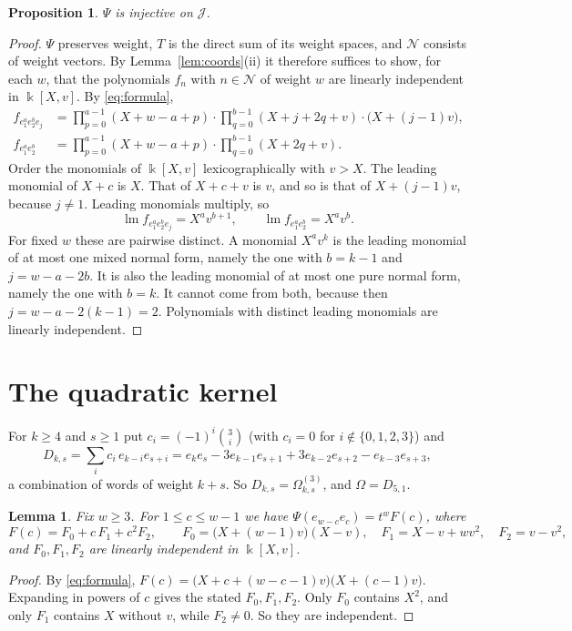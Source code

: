 \documentclass[11pt]{amsart}
\newtheorem{proposition}[theorem]{Proposition}
\newtheorem{lemma}[theorem]{Lemma}
\theoremstyle{definition}
\theoremstyle{remark}
\newcommand{\cJ}{\mathcal{J}}
\newcommand{\cN}{\mathcal{N}}
\newcommand{\lm}{\operatorname{lm}}
\newcommand{\kk}{\Bbbk}
\begin{document}
\begin{proposition}\label{prop:a}
$\Psi$ is injective on $\cJ$.
\end{proposition}

\begin{proof}
$\Psi$ preserves weight, $T$ is the direct sum of its weight spaces, and $\cN$ consists of weight vectors. By Lemma~\ref{lem:coords}(ii) it therefore suffices to show, for each $w$, that the polynomials $f_n$ with $n\in\cN$ of weight $w$ are linearly independent in $\kk[X,v]$. By \eqref{eq:formula},
\begin{align*}
f_{e_1^ae_2^be_j}&=\prod_{p=0}^{a-1}(X+w-a+p)\cdot\prod_{q=0}^{b-1}(X+j+2q+v)\cdot\bigl(X+(j-1)v\bigr),\\
f_{e_1^ae_2^b}&=\prod_{p=0}^{a-1}(X+w-a+p)\cdot\prod_{q=0}^{b-1}(X+2q+v).
\end{align*}
Order the monomials of $\kk[X,v]$ lexicographically with $v>X$. The leading monomial of $X+c$ is $X$. That of $X+c+v$ is $v$, and so is that of $X+(j-1)v$, because $j\neq1$. Leading monomials multiply, so
\[
\lm f_{e_1^ae_2^be_j}=X^av^{b+1},\qquad \lm f_{e_1^ae_2^b}=X^av^b .
\]
For fixed $w$ these are pairwise distinct. A monomial $X^av^k$ is the leading monomial of at most one mixed normal form, namely the one with $b=k-1$ and $j=w-a-2b$. It is also the leading monomial of at most one pure normal form, namely the one with $b=k$. It cannot come from both, because then $j=w-a-2(k-1)=2$. Polynomials with distinct leading monomials are linearly independent.
\end{proof}

\section{The quadratic kernel}

For $k\ge4$ and $s\ge1$ put $c_i=(-1)^i\binom3i$ (with $c_i=0$ for $i\notin\{0,1,2,3\}$) and
\[
D_{k,s}=\sum_{i}c_i\,e_{k-i}e_{s+i}=e_ke_s-3e_{k-1}e_{s+1}+3e_{k-2}e_{s+2}-e_{k-3}e_{s+3},
\]
a combination of words of weight $k+s$. So $D_{k,s}=\Omega^{(3)}_{k,s}$, and $\Omega=D_{5,1}$.

\begin{lemma}\label{lem:F}
Fix $w\ge3$. For $1\le c\le w-1$ we have $\Psi(e_{w-c}e_c)=t^wF(c)$, where
\[
F(c)=F_0+c\,F_1+c^2F_2,\qquad
F_0=\bigl(X+(w-1)v\bigr)(X-v),\quad F_1=X-v+wv^2,\quad F_2=v-v^2,
\]
and $F_0,F_1,F_2$ are linearly independent in $\kk[X,v]$.
\end{lemma}

\begin{proof}
By \eqref{eq:formula}, $F(c)=\bigl(X+c+(w-c-1)v\bigr)\bigl(X+(c-1)v\bigr)$. Expanding in powers of $c$ gives the stated $F_0,F_1,F_2$. Only $F_0$ contains $X^2$, and only $F_1$ contains $X$ without $v$, while $F_2\neq0$. So they are independent.
\end{proof}
\end{document}
